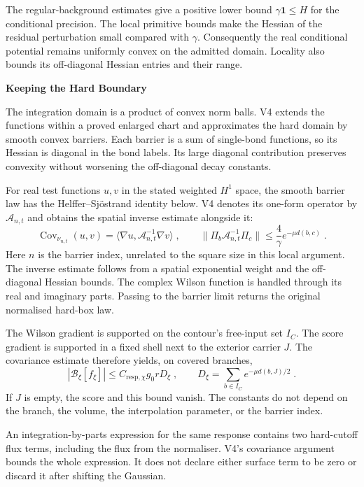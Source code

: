 \documentclass[11pt,a4paper]{article}
\newcommand{\id}{\mathbf 1}
\newcommand{\subhead}[1]{\par\vspace{4pt}\textbf{\color{ink}#1}\par}
\begin{document}
The regular-background estimates give a positive lower bound $\gamma\id\leqslant  H$ for the conditional precision. The local primitive bounds make the Hessian of the residual perturbation small compared with $\gamma$. Consequently the real conditional potential remains uniformly convex on the admitted domain. Locality also bounds its off-diagonal Hessian entries and their range.

\subhead{Keeping the Hard Boundary}
The integration domain is a product of convex norm balls. V4 extends the functions within a proved enlarged chart and approximates the hard domain by smooth convex barriers. Each barrier is a sum of single-bond functions, so its Hessian is diagonal in the bond labels. Its large diagonal contribution preserves convexity without worsening the off-diagonal decay constants.

For real test functions $u,v$ in the stated weighted $H^1$ space, the smooth barrier law has the Helffer--Sj\"ostrand identity below. V4 denotes its one-form operator by $\mathscr A_{n,t}$ and obtains the spatial inverse estimate alongside it:
\begin{equation*}
    \operatorname{Cov}_{\nu_{n,t}}(u,v)
        =\langle\nabla u,\mathscr A_{n,t}^{-1}\nabla v\rangle\;,
    \qquad
    \|\Pi_b\mathscr A_{n,t}^{-1}\Pi_c\|
        \leqslant  \frac{4}{\gamma}e^{-\mu d(b,c)}\;.
\end{equation*}
Here $n$ is the barrier index, unrelated to the square size in this local argument. The inverse estimate follows from a spatial exponential weight and the off-diagonal Hessian bounds. The complex Wilson function is handled through its real and imaginary parts. Passing to the barrier limit returns the original normalised hard-box law.

The Wilson gradient is supported on the contour's free-input set $I_C$. The score gradient is supported in a fixed shell next to the exterior carrier $J$. The covariance estimate therefore yields, on covered branches,
\begin{equation*}
    |\mathcal B_\xi[f_\xi]|
        \leqslant  C_{\mathrm{resp},\chi}g_0rD_\xi\;,
    \qquad D_\xi=\sum_{b\in I_C}e^{-\mu d(b,J)/2}\;.
\end{equation*}
If $J$ is empty, the score and this bound vanish. The constants do not depend on the branch, the volume, the interpolation parameter, or the barrier index.

An integration-by-parts expression for the same response contains two hard-cutoff flux terms, including the flux from the normaliser. V4's covariance argument bounds the whole expression. It does not declare either surface term to be zero or discard it after shifting the Gaussian.
\end{document}
